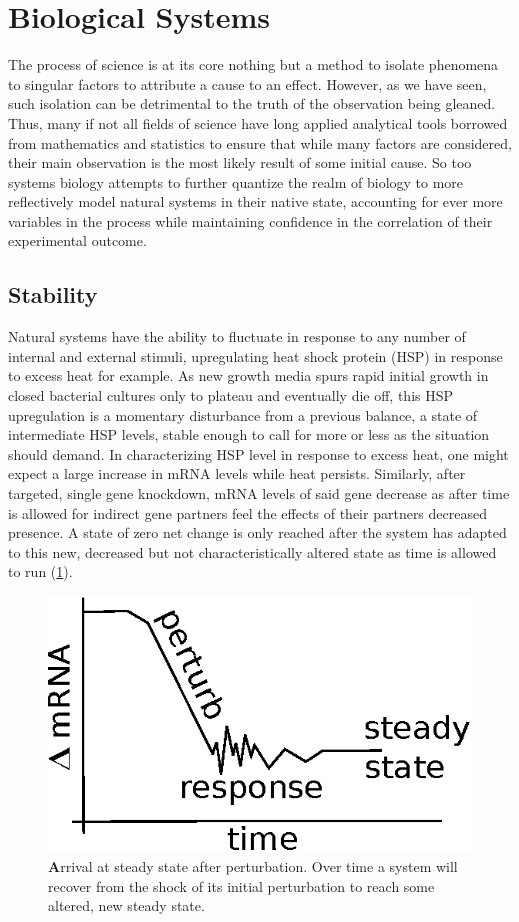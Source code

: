 

\section{Biological Systems}
\label{sec:biosys}
The process of science is at its core nothing but a method to isolate phenomena to singular factors to attribute a cause to an effect. However, as we have seen, such isolation can be detrimental to the truth of the observation being gleaned. Thus, many if not all fields of science have long applied analytical tools borrowed from mathematics and statistics to ensure that while many factors are considered, their main observation is the most likely result of some initial cause. So too systems biology attempts to further quantize the realm of biology to more reflectively model natural systems in their native state, accounting for ever more variables in the process while maintaining confidence in the correlation of their experimental outcome.

\subsection{Stability}
\label{sec:stab}
Natural systems have the ability to fluctuate in response to any number of internal and external stimuli, upregulating heat shock protein (HSP) in response to excess heat for example. As new growth media spurs rapid initial growth in closed bacterial cultures only to plateau and eventually die off, this HSP upregulation is a momentary disturbance from a previous balance, a state of intermediate HSP levels, stable enough to call for more or less as the situation should demand. In characterizing HSP level in response to excess heat, one might expect a large increase in mRNA levels while heat persists. Similarly, after targeted, single gene knockdown, mRNA levels of said gene decrease as after time is allowed for indirect gene partners feel the effects of their partners decreased presence. A state of zero net change is only reached after the system has adapted to this new, decreased but not characteristically altered state as time is allowed to run (\cref{fig:SS}).

\begin{figure}[H]
\centering
\includegraphics[width=.5\linewidth]{4/pert.eps}
\caption{{\textbf Arrival at steady state after perturbation.} Over time a system will recover from the shock of its initial perturbation to reach some altered, new steady state.
}
\label{fig:SS}
\end{figure}

